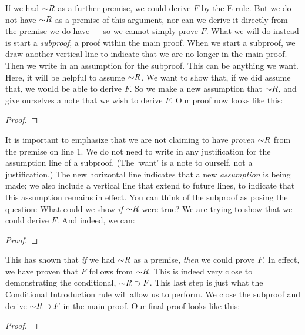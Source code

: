 If we had $\enot R$ as a further premise, we could derive $F$ by the {\eor}E rule. But we do not have $\enot R$ as a premise of this argument, nor can we derive it directly from the premise we do have --- so we cannot simply prove $F$. What we will do instead is start a \emph{subproof}, a proof within the main proof. When we start a subproof, we draw another vertical line to indicate that we are no longer in the main proof. Then we write in an assumption for the subproof. This can be anything we want. Here, it will be helpful to assume $\enot R$. We want to show that, if we did assume that, we would be able to derive $F$. So we make a new assumption that $\enot R$, and give ourselves a note that we wish to derive $F$. Our proof now looks like this:

\begin{proof}
	  
	\open
		 
		\have{}{}
	\close
\end{proof}

It is important to emphasize that we are not claiming to have \emph{proven} $\enot R$ from the premise on line 1. We do not need to write in any justification for the assumption line of a subproof. (The `want' is a note to ourself, not a justification.) The new horizontal line indicates that a new \emph{assumption} is being made; we also include a vertical line that extend to future lines, to indicate that this assumption remains in effect. You can think of the subproof as posing the question: What could we show \emph{if} $\enot R$ were true? We are trying to show that we could derive $F$. And indeed, we can:

\begin{proof}
	  
	\open
		 
	\close
\end{proof}

This has shown that \emph{if} we had $\enot R$ as a premise, \emph{then} we could prove $F$. In effect, we have proven that $F$ follows from $\enot R$. This is indeed very close to demonstrating the conditional, $\enot R \eif F$. This last step is just what the Conditional Introduction rule will allow us to perform. We close the subproof and derive $\enot R \eif F$ in the main proof. Our final proof looks like this:

\begin{proof}
	\open
	\close
\end{proof}

